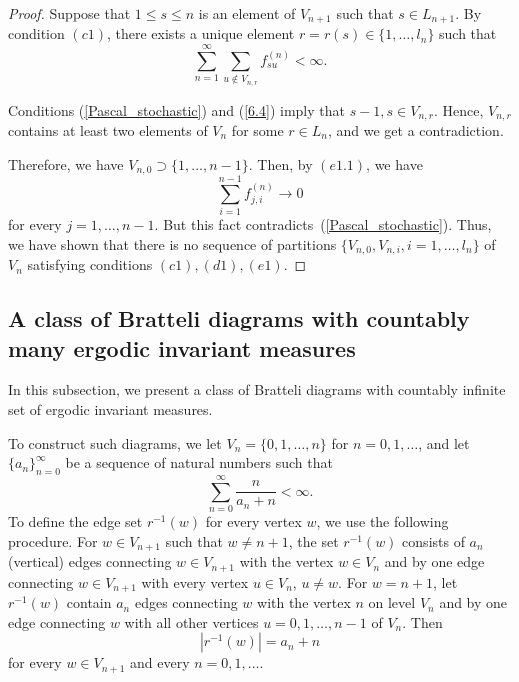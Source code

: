 \documentclass[11pt, english, reqno]{amsart}
\theoremstyle{definition}
\theoremstyle{remark}
\theoremstyle{plain}
\numberwithin{equation}{section}
\begin{document}
{\begin{proof}
Suppose that $1 \leq s \leq n$ is an element of $V_{n+1}$ such that $s \in
L_{n+1}$. By condition $(c1)$, there exists a unique element $r = r(s) \in
\{1,\ldots,l_n\}$ such that
\begin{equation}\label{6.4}
\sum_{n = 1}^{\infty}\sum_{u \notin V_{n,r}} f_{su}^{(n)} < \infty.
\end{equation}

Conditions (\ref{Pascal_stochastic}) and (\ref{6.4}) imply that $s-1, s \in
V_{n,r}$. Hence, $V_{n,r}$ contains at least two elements of $V_n$ for
 some $r \in L_n$, and we get a contradiction.

Therefore, we have $V_{n,0} \supset \{1,\ldots, n-1\}$.
Then, by $(e1.1)$, we have
$$
\sum_{i = 1}^{n - 1} f_{j,i}^{(n)} \rightarrow 0
$$
for every $j = 1,\ldots, n-1$. But this fact
 contradicts~(\ref{Pascal_stochastic}).
Thus, we have shown that there is no sequence of partitions $\{V_{n,0},
V_{n,i}, i = 1,\ldots,l_n\}$ of $V_n$ satisfying conditions $(c1),(d1),(e1)$.
\end{proof}

\subsection{A class of Bratteli diagrams with countably many ergodic
invariant measures}\label{subsection_cntbl_erg_meas}
 In this subsection, we present a class of
 Bratteli diagrams with countably infinite set of ergodic invariant measures.

To construct such diagrams, we  let $V_n = \{0, 1, \ldots, n\}$ for
$n = 0, 1, \ldots$, and let
$\{a_n\}_{n = 0}^{\infty}$ be a sequence of natural numbers such that
\begin{equation}\label{property1}
\sum_{n = 0}^{\infty} \frac{n}{a_n + n} < \infty.
\end{equation}
To define the edge set $r^{-1}(w)$ for every vertex $w$, we
use the following procedure.
 For $w\in V_{n+1}$ such that $w\neq n
+1$, the set $r^{-1}(w)$ consists of $a_n$ (vertical) edges connecting
$w \in V_{n+1}$ with the vertex $w \in V_n$ and by one edge connecting
 $w \in V_{n+1}$ with every vertex $u \in V_n$, $u \neq w$.
For $w=n+1$,  let $r^{-1}(w)$ contain $a_n$ edges connecting $w$
 with the vertex $n$ on level $V_n$ and by one edge connecting $w$ with
  all other vertices $u = 0,1, \ldots, n-1$ of $V_n$. Then
 $$
 |r^{-1}(w)| = a_n + n
 $$
for every $w \in V_{n+1}$ and every $n = 0,1, \ldots$.

}
\end{document}

